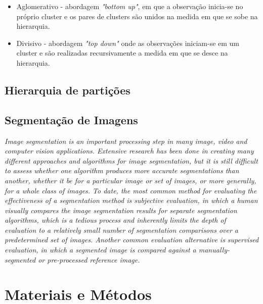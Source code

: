 \begin{document}
\begin{itemize}
 \item Aglomerativo - abordagem \textit{"bottom up"}, em que a observação inicia-se no próprio cluster e os pares de clusters são unidos na medida em que se sobe na hierarquia. 
 \item Divisivo - abordagem \textit{"top down"} onde as observações iniciam-se em um cluster e são realizadas recursivamente a medida em que se desce na hierarquia.
\end{itemize}

\subsection{Hierarquia de partições} \label{sssec:hierarchy}

\subsection{Segmentação de Imagens} \label{ssec:segmentacao}

\textit{Image segmentation is an important processing step in many image, video and computer vision applications. Extensive research has been done in creating many different approaches and algorithms for image segmentation, but it is still difficult to assess whether one algorithm produces more accurate segmentations than another, whether it be for a particular image or set of images, or more generally, for a whole class of images. To date, the most common method for evaluating the effectiveness of a segmentation method is subjective evaluation, in which a human visually compares the image segmentation results for separate segmentation algorithms, which is a tedious process and inherently limits the depth of evaluation to a relatively small number of segmentation comparisons over a predetermined set of images. Another common evaluation alternative is supervised evaluation, in which a segmented image is compared against a manually-segmented or pre-processed reference image.}


\section{Materiais e Métodos} \label{sec:mat_metodos}

\end{document}
